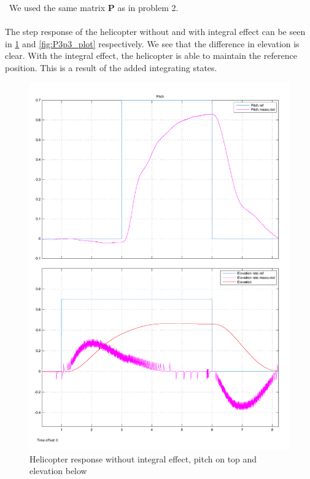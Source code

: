 \ We used the same matrix $\mathbf{P}$ as in problem 2.\\ \\The step response of the helicopter without and with integral effect can be seen in \cref{fig:P3p2_plot} and \cref{fig:P3p3_plot} respectively. We see that the difference in elevation is clear. With the integral effect, the helicopter is able to maintain the reference position. This is a result of the added integrating states.


\begin{figure}[htb]
	\centering
		\includegraphics[width=\textwidth]{figures/P3p2_good.pdf}
	\caption{Helicopter response without integral effect, pitch on top and elevation below}
\label{fig:P3p2_plot}
\end{figure}

